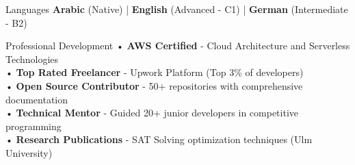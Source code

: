 \documentclass{resume}
\begin{document}

\begin{rSection}{Languages}
{\bf Arabic} (Native) | {\bf English} (Advanced - C1) | {\bf German} (Intermediate - B2)
\end{rSection}


\begin{rSection}{Professional Development}
• {\bf AWS Certified} - Cloud Architecture and Serverless Technologies \\
• {\bf Top Rated Freelancer} - Upwork Platform (Top 3\% of developers) \\
• {\bf Open Source Contributor} - 50+ repositories with comprehensive documentation \\
• {\bf Technical Mentor} - Guided 20+ junior developers in competitive programming \\
• {\bf Research Publications} - SAT Solving optimization techniques (Ulm University) \\
\end{rSection}
\end{document}

